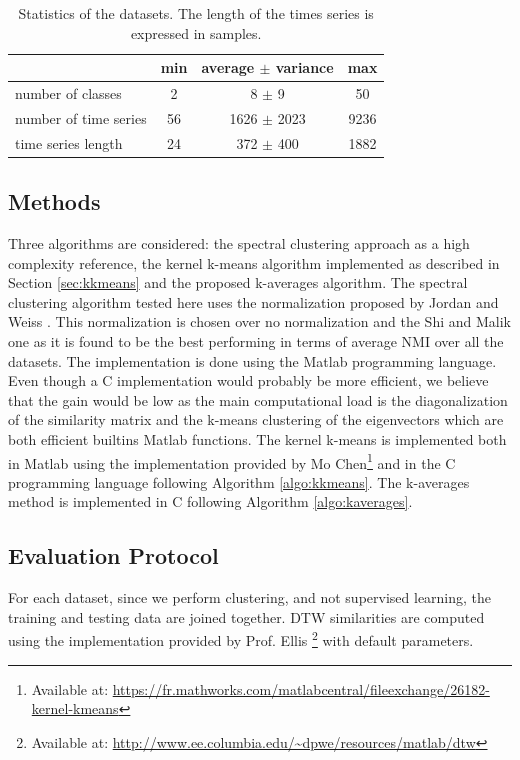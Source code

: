 \documentclass[natbib,smallextended]{svjour3}
\begin{document}
\begin{table}
\center
\caption{\label{tab:dbs} Statistics of the datasets. The length of the times series is expressed in samples.}
\begin{tabular}{l|ccc}
& min & average $\pm$ variance & max \\
\hline
number of classes & 2 & 8 $\pm$ 9 & 50 \\
number of time series & 56 & 1626 $\pm$ 2023 & 9236 \\
time series length & 24 & 372 $\pm$ 400 & 1882 \\
\end{tabular}
\end{table}

\subsection{Methods}

Three algorithms are considered: the spectral clustering \cite{von2007tutorial} approach as a high complexity reference, the kernel k-means algorithm implemented as described in Section \ref{sec:kkmeans} and the proposed k-averages algorithm. The spectral clustering algorithm tested here uses the normalization proposed by Jordan and Weiss \cite{ng2002spectral}. This normalization is chosen over no normalization and the Shi and Malik one \cite{shi2000normalized} as it is found to be the best performing in terms of average NMI over all the datasets. The implementation is done using the Matlab programming language. Even though a C implementation would probably be more efficient, we believe that the gain would be low as the main computational load is the diagonalization of the similarity matrix and the k-means clustering of the eigenvectors which are both efficient builtins Matlab functions. The kernel k-means is implemented both in Matlab using the implementation provided by Mo Chen\footnote{Available at: \url{https://fr.mathworks.com/matlabcentral/fileexchange/26182-kernel-kmeans}} and in the C programming language following Algorithm \ref{algo:kkmeans}. The k-averages method is implemented in C following Algorithm \ref{algo:kaverages}.

\subsection{Evaluation Protocol}

For each dataset, since we perform clustering, and not supervised learning, the training and testing data are joined together. DTW similarities are computed using the implementation provided by Prof. Ellis \footnote{Available at: \url{http://www.ee.columbia.edu/~dpwe/resources/matlab/dtw}} with default parameters.
\end{document}
